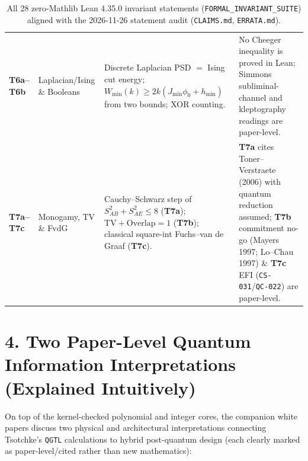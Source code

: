\documentclass[10pt,letterpaper]{article}
\newcommand{\code}[1]{\texttt{\fontsize{7.8pt}{9.2pt}\selectfont #1}}
\begin{document}
\begin{table}[h!]
\begin{tabularx}{\linewidth}{@{}L{1.45cm} L{2.85cm} L{5.20cm} Y@{}}
\textbf{T6a--T6b} & Laplacian/Ising \& Booleans & Discrete Laplacian PSD $=$ Ising cut energy; $W_{\min}(k){\ge}2k(J_{\min}\phi_0{+}h_{\min})$ from two bounds; XOR counting. & No Cheeger inequality is proved in Lean; Simmons subliminal-channel and kleptography readings are paper-level. \\
\textbf{T7a--T7c} & Monogamy, TV \& FvdG & Cauchy--Schwarz step of $S_{AB}^2{+}S_{AE}^2{\le}8$ (\textbf{T7a}); $\mathrm{TV}{+}\mathrm{Overlap}{=}1$ (\textbf{T7b}); classical square-int Fuchs--van de Graaf (\textbf{T7c}). & \textbf{T7a} cites Toner--Verstraete (2006) with quantum reduction assumed; \textbf{T7b} commitment no-go (Mayers 1997; Lo--Chau 1997) \& \textbf{T7c} EFI (\code{CS-031}/\code{QC-022}) are paper-level. \\
\bottomrule
\end{tabularx}
\vspace{-4pt}
\caption{\scriptsize All 28 zero-Mathlib Lean 4.35.0 invariant statements (\code{FORMAL\_INVARIANT\_SUITE}) aligned with the 2026-11-26 statement audit (\code{CLAIMS.md}, \code{ERRATA.md}).}
\label{tab:theorems}
\vspace{-6pt}
\end{table}

\section{4. Two Paper-Level Quantum Information Interpretations (Explained Intuitively)}
On top of the kernel-checked polynomial and integer cores, the companion white papers discuss two physical and architectural interpretations connecting Tsotchke's \code{QGTL} calculations to hybrid post-quantum design (each clearly marked as paper-level/cited rather than new mathematics):
\end{document}
